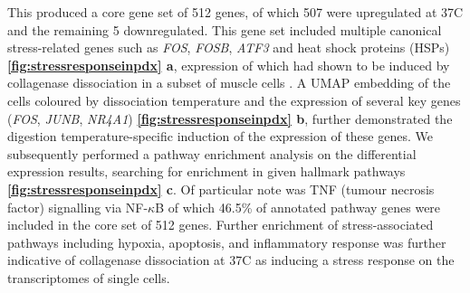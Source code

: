 This produced a core gene set of 512 genes, of which 507 were upregulated at 37\textdegree C and the remaining 5 downregulated. This gene set included multiple canonical stress-related genes such as \textit{FOS}, \textit{FOSB}, \textit{ATF3} and heat shock proteins (HSPs) \textbf{\autoref{fig:stressresponseinpdx} a}, expression of which had shown to be induced by collagenase dissociation in a subset of muscle cells \cite{van2017single}. A \ac{UMAP} embedding of the cells coloured by dissociation temperature and the expression of several key genes (\textit{FOS}, \textit{JUNB}, \textit{NR4A1}) \textbf{\autoref{fig:stressresponseinpdx} b}, further demonstrated the digestion temperature-specific induction of the expression of these genes.
We subsequently performed a pathway enrichment analysis on the differential expression results, searching for enrichment in given hallmark pathways \cite{liberzon2015molecular} \textbf{\autoref{fig:stressresponseinpdx} c}. Of particular note was TNF (tumour necrosis factor) signalling via NF-$\kappa$B of which 46.5\% of annotated pathway genes were included in the core set of 512 genes. Further enrichment of stress-associated pathways including hypoxia, apoptosis, and inflammatory response was further indicative of collagenase dissociation at 37\textdegree C as inducing a stress response on the transcriptomes of single cells.

